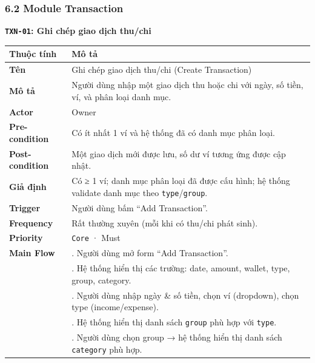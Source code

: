 \documentclass[11pt,a4paper]{article}
\newcounter{none}
\begin{document}
\subsubsection{6.2 Module Transaction}\label{module-transaction}

\textbf{\texttt{TXN-01}: Ghi chép giao dịch thu/chi}

{\def\LTcaptype{none}
\begin{longtable}[]{@{}
  >{\raggedright\arraybackslash}p{}
  >{\raggedright\arraybackslash}p{}@{}}
\toprule\noalign{}
\begin{minipage}[b]{\linewidth}\raggedright
Thuộc tính
\end{minipage} & \begin{minipage}[b]{\linewidth}\raggedright
Mô tả
\end{minipage} \\
\midrule\noalign{}
\endhead
\bottomrule\noalign{}
\endlastfoot
\textbf{Tên} & Ghi chép giao dịch thu/chi (Create Transaction) \\ 
\textbf{Mô tả} & Người dùng nhập một giao dịch thu hoặc chi với ngày, số tiền, ví, và phân loại danh mục. \\ 
\textbf{Actor} & Owner \\ 
\textbf{Pre-condition} & Có ít nhất 1 ví và hệ thống đã có danh mục phân loại. \\ 
\textbf{Post-condition} & Một giao dịch mới được lưu, số dư ví tương ứng được cập nhật. \\ 
\textbf{Giả định} & Có ≥ 1 ví; danh mục phân loại đã được cấu hình; hệ thống validate danh mục theo \texttt{type}/\texttt{group}. \\ 
\textbf{Trigger} & Người dùng bấm ``Add Transaction''. \\ 
\textbf{Frequency} & Rất thường xuyên (mỗi khi có thu/chi phát sinh). \\ 
\textbf{Priority} & \texttt{Core} · Must \\ 
\textbf{Main Flow} & 1. Người dùng mở form ``Add Transaction''.\\
&2. Hệ thống hiển thị các trường: date, amount, wallet, type, group, category.\\
&3. Người dùng nhập ngày \& số tiền, chọn ví (dropdown), chọn type (income/expense).\\
&4. Hệ thống hiển thị danh sách \texttt{group} phù hợp với \texttt{type}.\\
&5. Người dùng chọn group → hệ thống hiển thị danh sách \texttt{category} phù hợp.\\

\end{longtable}}
\end{document}
